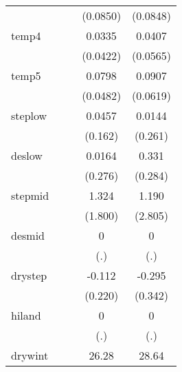 {\begin{tabular}{l*{4}{c}}
            &                     &                     &    (0.0850)         &    (0.0848)         \\
[1em]
temp4       &                     &                     &      0.0335         &      0.0407         \\
            &                     &                     &    (0.0422)         &    (0.0565)         \\
[1em]
temp5       &                     &                     &      0.0798         &      0.0907         \\
            &                     &                     &    (0.0482)         &    (0.0619)         \\
[1em]
steplow     &                     &                     &      0.0457         &      0.0144         \\
            &                     &                     &     (0.162)         &     (0.261)         \\
[1em]
deslow      &                     &                     &      0.0164         &       0.331         \\
            &                     &                     &     (0.276)         &     (0.284)         \\
[1em]
stepmid     &                     &                     &       1.324         &       1.190         \\
            &                     &                     &     (1.800)         &     (2.805)         \\
[1em]
desmid      &                     &                     &           0         &           0         \\
            &                     &                     &         (.)         &         (.)         \\
[1em]
drystep     &                     &                     &      -0.112         &      -0.295         \\
            &                     &                     &     (0.220)         &     (0.342)         \\
[1em]
hiland      &                     &                     &           0         &           0         \\
            &                     &                     &         (.)         &         (.)         \\
[1em]
drywint     &                     &                     &       26.28         &       28.64         \\

\end{tabular}}

